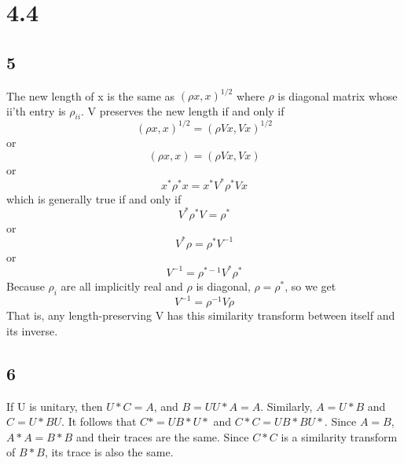 \documentclass{article}
\begin{document}
\section*{4.4}
\subsection*{5}
The new length of x is the same as $(\rho x, x)^{1/2}$ where $\rho$ is diagonal matrix whose ii'th entry is $\rho_{ii}$.  V preserves the new length if and only if
$$(\rho x, x)^{1/2} = (\rho Vx,Vx)^{1/2}$$
or 
$$(\rho x, x) = (\rho V x, V x)$$
or
$$x^*\rho^*x = x^*V^*\rho^*Vx$$
which is generally true if and only if 
$$V^*\rho^*V = \rho^*$$
or 
$$V^*\rho = \rho^*V^{-1}$$
or
$$V^{-1} = \rho^{*-1}V^*\rho^*$$
Because $\rho_i$ are all implicitly real and $\rho$ is diagonal, $\rho = \rho^*$, so we get
$$V^{-1} = \rho^{-1}V\rho$$
That is, any length-preserving V has this similarity transform between itself and its inverse.

\subsection*{6}
If U is unitary, then $U*C = A$, and $B=UU*A=A$.  Similarly, $A = U*B$ and $C = U*BU$.  It follows that $C* = UB*U*$ and $C*C = UB*BU*$.  Since $A = B$, $A*A = B*B$ and their traces are the same.  Since $C*C$ is a similarity transform of $B*B$, its trace is also the same. 
\end{document}
